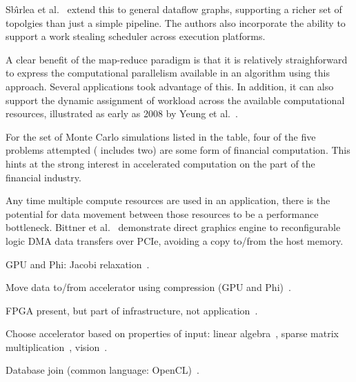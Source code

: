 Sb\^{\i}rlea et al.~\cite{szb+12} extend this to general dataflow graphs,
supporting a richer set of topolgies than just a simple pipeline.  The authors
also incorporate the ability to support a work stealing scheduler across
execution platforms.

A clear benefit of the map-reduce paradigm is that it is relatively
straighforward to express the computational parallelism available in
an algorithm using this approach.  Several applications took advantage
of this.  In addition, it can also support the dynamic assignment of
workload across the available computational resources, illustrated as
early as 2008 by Yeung et al.~\cite{ytt+08}.

For the set of Monte Carlo simulations listed in the table,
four of the five problems attempted
(\cite{tttl10} includes two) are some form of financial computation.
This hints at the strong interest in accelerated computation on the
part of the financial industry.

Any time multiple compute resources are used in an application, there is
the potential for data movement between those resources to be a performance
bottleneck.  Bittner et al.~\cite{brf14} demonstrate direct graphics engine
to reconfigurable logic DMA data transfers over PCIe, avoiding a copy
to/from the host memory.

GPU and Phi:
Jacobi relaxation~\cite{cv16}.

Move data to/from accelerator using compression (GPU and Phi)~\cite{bkp15}.

FPGA present, but part of infrastructure, not application~\cite{abb+13}.

Choose accelerator based on properties of input:
linear algebra~\cite{gchg16,sll+13},
sparse matrix multiplication~\cite{gsbh16},
vision~\cite{mfo+16}.


Database join (common language: OpenCL)~\cite{rl17}.





